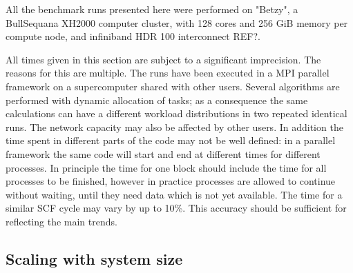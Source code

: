 \documentclass[%
 aip,
 amsmath,amssymb,
 reprint,%
]{revtex4-1}
\begin{document}
All the benchmark runs presented here were performed on "Betzy", a BullSequana XH2000 computer cluster, with 128 cores and 256 GiB memory per compute node, and infiniband HDR 100 interconnect REF?.

All times given in this section are subject to a significant imprecision. The reasons for this are multiple. The runs have been executed in a MPI parallel framework on a supercomputer shared with other users. Several algorithms are performed with dynamic allocation of tasks; as a consequence the same calculations can have a different workload distributions in two repeated identical runs. The network capacity may also be affected by other users. In addition the time spent in different parts of the code may not be well defined: in a parallel framework the same code will start and end at different times for different processes. In principle the time for one block should include the time for all processes to be finished, however in practice processes are allowed to continue without waiting, until they need data which is not yet available.
The time for a similar SCF cycle may vary by up to 10\%. This accuracy should be sufficient for reflecting the main trends. 

\subsection{Scaling with system size}
\end{document}
